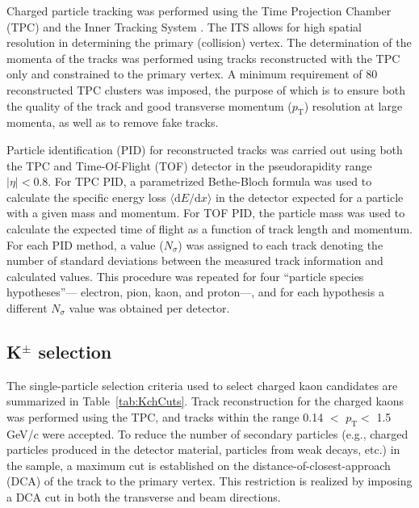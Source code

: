 \documentclass[ALICE,manyauthors]{cernphprep}
\newcommand{\pt}{$p_{\mathrm{T}}$\xspace}
\begin{document}
Charged particle tracking was performed using the Time Projection Chamber (TPC) \cite{2010NIMPA.622..316A} and the Inner Tracking System \cite{Abelevetal:2014dna}.  
The ITS allows for high spatial resolution in determining the primary (collision) vertex.
The determination of the momenta of the tracks was performed using tracks reconstructed with the TPC only and constrained to the primary vertex.
A minimum requirement of 80 reconstructed TPC clusters was imposed, the purpose of which is to ensure both the quality of the track and good transverse momentum (\pt) resolution at large momenta, as well as to remove fake tracks.

Particle identification (PID) for reconstructed tracks was carried out using both the TPC and Time-Of-Flight (TOF) detector \cite{Abelev:2014ffa, Akindinov:2013tea} in the pseudorapidity range $|\eta| < 0.8$.  
For TPC PID, a parametrized Bethe-Bloch formula was used to calculate the specific energy loss $\langle \mathrm{d}E/\mathrm{d}x \rangle$ in the detector expected for a particle with a given mass and momentum.  
For TOF PID, the particle mass was used to calculate the expected time of flight as a function of track length and momentum.  
For each PID method, a value ($N_{\sigma}$) was assigned to each track denoting the number of standard deviations between the measured track information and calculated values.  
This procedure was repeated for four ``particle species hypotheses''--- electron, pion, kaon, and proton---, and for each hypothesis a different $N_{\sigma}$ value was obtained per detector.

\subsection{K$^{\pm}$ selection}
\label{sec:KchSelection}
The single-particle selection criteria used to select charged kaon candidates are summarized in Table~\ref{tab:KchCuts}.
Track reconstruction for the charged kaons was performed using the TPC, and tracks within the range 0.14 $<$ \pt $<$ 1.5 GeV/$c$ were accepted.
To reduce the number of secondary particles (e.g., charged particles produced in the detector material, particles from weak decays, etc.) in the sample, a maximum cut is established on the distance-of-closest-approach (DCA) of the track to the primary vertex.
This restriction is realized by imposing a DCA cut in both the transverse and beam directions.
\end{document}
